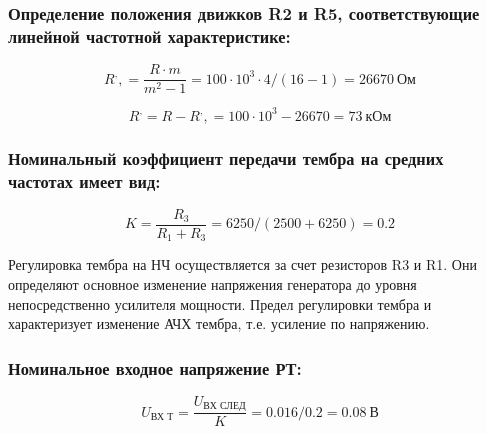 \subsubsection{ Определение положения движков R2 и R5, соответствующие линейной частотной характеристике:}

  \begin{equation}
  \label{eq:equation5_16}
  R^,,=\dfrac{R \cdot m}{m^2-1}=100 \cdot 10^3 \cdot  4/(16-1)=26670~\text{Ом}
  \end{equation}

  \begin{equation}
  \label{eq:equation5_17}
  R^,=R-R^,,=100 \cdot 10^3 -26670=73~\text{кОм}
  \end{equation}

  \subsubsection{ Номинальный коэффициент передачи тембра на средних частотах имеет вид:}
   
  \begin{equation}
  \label{eq:equation5_18}
   K=\dfrac {R_3}{R_1+R_3}=6250/(2500+6250)=0.2
  \end{equation}

  Регулировка тембра на НЧ осуществляется за счет резисторов R3 и R1. Они определяют основное изменение напряжения генератора до уровня непосредственно усилителя мощности. Предел регулировки тембра и характеризует изменение АЧХ тембра, т.е. усиление по напряжению.

  \subsubsection{  Номинальное входное напряжение РТ:}

  \begin{equation}
  \label{eq:equation5_19}
   U_{\text{ВХ Т}}=\dfrac{U_{\text{ВХ СЛЕД}}}{K}=0.016/0.2=0.08~\text{В}
  \end{equation}


   